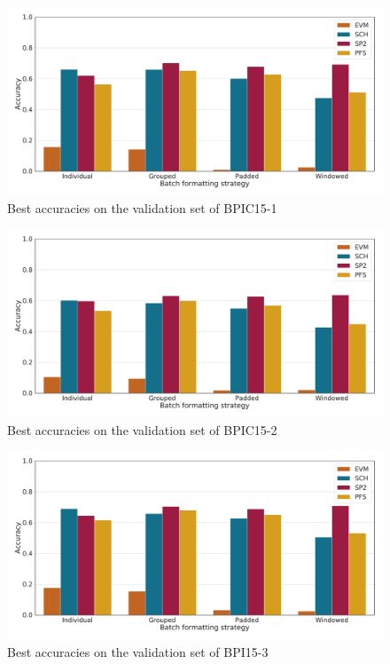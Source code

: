 \begin{figure}
    \centering
    \includegraphics[width=\textwidth]{gfx/bpic2015_1/accuracies.pdf}
    \caption{Best accuracies on the validation set of BPIC15-1}
    \label{fig:max-accuracies-bpic2015-1}
\end{figure}
\begin{figure}
    \centering
    \includegraphics[width=\textwidth]{gfx/bpic2015_2/accuracies.pdf}
    \caption{Best accuracies on the validation set of BPIC15-2}
    \label{fig:max-accuracies-bpic2015-2}
\end{figure}
\begin{figure}
    \centering
    \includegraphics[width=\textwidth]{gfx/bpic2015_3/accuracies.pdf}
    \caption{Best accuracies on the validation set of BPI15-3}
    \label{fig:max-accuracies-bpic2015-3}
\end{figure}
